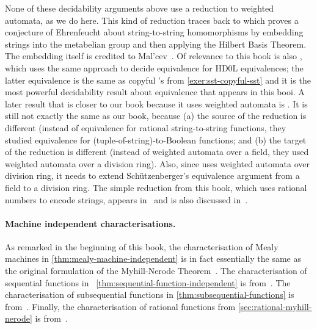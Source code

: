  None of these decidability arguments above use a reduction to weighted automata, as we do here. 
    This kind of reduction traces back to \cite[Theorem 1]{AlbertLawrence1985} which proves a conjecture of Ehrenfeucht about string-to-string homomorphisms by embedding strings into the metabelian group and then applying the Hilbert Basis Theorem. The embedding itself is credited to Mal'cev~\cite{Malcev1953Nilpotent}. Of relevance to this book is also \cite[Theorem 1]{AlbertLawrence1985}, which uses the same approach to decide equivalence for HD0L equivalences; the latter equivalence is the same as copyful \sst's from \cref{exer:sst-copyful-sst} and it is the most powerful decidability result about equivalence that appears in this booi. A later result that is closer to our book because it uses weighted automata is  \cite{HarjuKarhumaki1991}. It is still not exactly the same as our book, because (a) the source of the reduction is different (instead of equivalence for rational string-to-string functions, they studied equivalence for  (tuple-of-string)-to-Boolean functions; and (b) the target of the reduction is different (instead of weighted automata over a field, they used weighted automata over a division ring). Also, since \cite{HarjuKarhumaki1991}  uses weighted automata over division ring, it  needs to extend Sch\"utzenberger's equivalence argument from a field to a division ring. The simple reduction from this book, which uses rational numbers to encode strings, appears in~\cite[p. 21:4]{Seidl2018} and is also discussed in~\cite[p. 6]{Bojanczyk2019Hilbert}.

\paragraph*{Machine independent characterisations.} As remarked in the beginning of this book, the characterisation of Mealy machines in \cref{thm:mealy-machine-independent} is in fact essentially the same as the original formulation of the Myhill-Nerode Theorem~\cite[Lemma]{nerode1958}. The characterisation of sequential functions in ~\cref{thm:sequential-function-independent} is from~\cite[p. 381]{GinsburgRose1966}. The characterisation of subsequential  functions in \cref{thm:subsequential-functions} is from~\cite[Proposition 3.4]{choffrut1977}. Finally, the characterisation of rational functions  from \cref{sec:rational-myhill-nerode} is from~\cite[Theorem 1 on p. 674]{reutenauer1991minimization}.